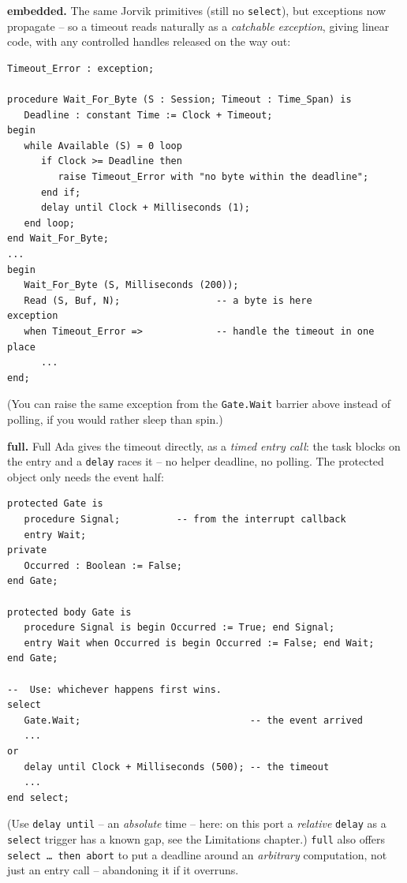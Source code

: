 \textbf{embedded.} The same Jorvik primitives (still no \texttt{select}), but
exceptions now propagate -- so a timeout reads naturally as a \emph{catchable
exception}, giving linear code, with any controlled handles released on the way
out:

\begin{lstlisting}
Timeout_Error : exception;

procedure Wait_For_Byte (S : Session; Timeout : Time_Span) is
   Deadline : constant Time := Clock + Timeout;
begin
   while Available (S) = 0 loop
      if Clock >= Deadline then
         raise Timeout_Error with "no byte within the deadline";
      end if;
      delay until Clock + Milliseconds (1);
   end loop;
end Wait_For_Byte;
...
begin
   Wait_For_Byte (S, Milliseconds (200));
   Read (S, Buf, N);                 -- a byte is here
exception
   when Timeout_Error =>             -- handle the timeout in one place
      ...
end;
\end{lstlisting}

(You can raise the same exception from the \texttt{Gate.Wait} barrier above
instead of polling, if you would rather sleep than spin.)

\textbf{full.} Full Ada gives the timeout directly, as a \emph{timed entry call}:
the task blocks on the entry and a \texttt{delay} races it -- no helper deadline,
no polling. The protected object only needs the event half:

\begin{lstlisting}
protected Gate is
   procedure Signal;          -- from the interrupt callback
   entry Wait;
private
   Occurred : Boolean := False;
end Gate;

protected body Gate is
   procedure Signal is begin Occurred := True; end Signal;
   entry Wait when Occurred is begin Occurred := False; end Wait;
end Gate;

--  Use: whichever happens first wins.
select
   Gate.Wait;                              -- the event arrived
   ...
or
   delay until Clock + Milliseconds (500); -- the timeout
   ...
end select;
\end{lstlisting}

(Use \texttt{delay until} -- an \emph{absolute} time -- here: on this port a
\emph{relative} \texttt{delay} as a \texttt{select} trigger has a known gap, see
the Limitations chapter.) \texttt{full} also offers \texttt{select \dots\ then
abort} to put a deadline around an \emph{arbitrary} computation, not just an entry
call -- abandoning it if it overruns.

